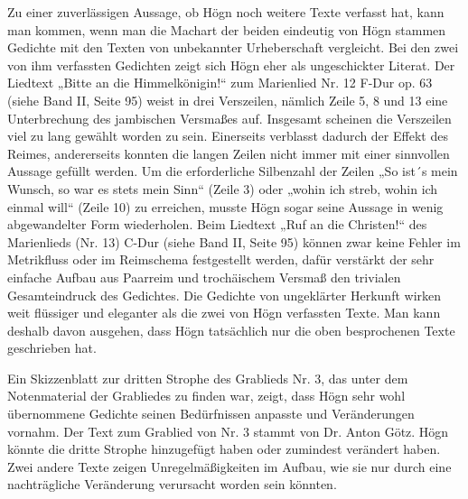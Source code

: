 \documentclass[a4paper]{article}
\begin{document}
Zu einer zuverlässigen Aussage, ob Högn noch weitere Texte verfasst hat,
kann man kommen, wenn man die Machart der beiden eindeutig von Högn
stammen Gedichte mit den Texten von unbekannter Urheberschaft
vergleicht. Bei den zwei von ihm verfassten Gedichten zeigt sich Högn
eher als ungeschickter Literat. Der Liedtext „Bitte an die
Himmelkönigin!“ zum Marienlied Nr. 12 F-Dur op. 63 (siehe Band II,
Seite 95) weist in drei Verszeilen, nämlich Zeile 5, 8 und 13 eine
Unterbrechung des jambischen Versmaßes auf. Insgesamt scheinen die
Verszeilen viel zu lang gewählt worden zu sein. Einerseits verblasst
dadurch der Effekt des Reimes, andererseits konnten die langen Zeilen
nicht immer mit einer sinnvollen Aussage gefüllt werden. Um die
erforderliche Silbenzahl der Zeilen „So ist´s mein Wunsch, so war es
stets mein Sinn“ (Zeile 3) oder „wohin ich streb, wohin ich einmal
will“ (Zeile 10) zu erreichen, musste Högn sogar seine Aussage in wenig
abgewandelter Form wiederholen. Beim Liedtext „Ruf an die Christen!“
des Marienlieds (Nr. 13) C-Dur (siehe Band II, Seite 95) können zwar
keine Fehler im Metrikfluss oder im Reimschema festgestellt werden,
dafür verstärkt der sehr einfache Aufbau aus Paarreim und trochäischem
Versmaß den trivialen Gesamteindruck des Gedichtes. Die Gedichte von
ungeklärter Herkunft wirken weit flüssiger und eleganter als die zwei
von Högn verfassten Texte. Man kann deshalb davon ausgehen, dass Högn
tatsächlich nur die oben besprochenen Texte geschrieben hat.

Ein Skizzenblatt zur dritten Strophe des Grablieds Nr. 3, das unter dem
Notenmaterial der Grabliedes zu finden war, zeigt, dass Högn sehr wohl
übernommene Gedichte seinen Bedürfnissen anpasste und Veränderungen
vornahm. Der Text zum Grablied von Nr. 3 stammt von Dr. Anton Götz.
Högn könnte die dritte Strophe hinzugefügt haben oder zumindest
verändert haben. Zwei andere Texte zeigen Unregelmäßigkeiten im Aufbau,
wie sie nur durch eine nachträgliche Veränderung verursacht worden sein
könnten.
\end{document}
